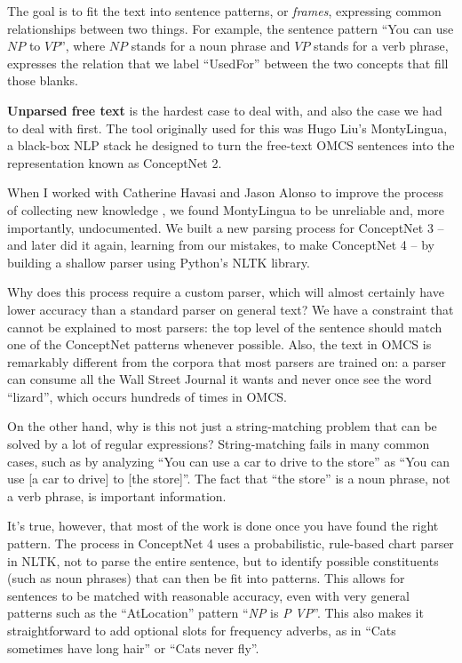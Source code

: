 \documentclass[11pt]{article}
\begin{document}
The goal is to fit the text into sentence patterns, or {\em frames}, expressing
common relationships between two things. For example, the sentence pattern
``You can use $NP$ to $VP$'', where $NP$ stands for a noun phrase and $VP$
stands for a verb phrase, expresses the relation that we label ``UsedFor''
between the two concepts that fill those blanks.

{\bf Unparsed free text} is the hardest case to deal with, and also the case we
had to deal with first. The tool originally used for this was Hugo Liu's
MontyLingua, a black-box NLP stack he designed to turn the free-text OMCS
sentences into the representation known as ConceptNet 2.

When I worked with Catherine Havasi and Jason Alonso to improve the process of
collecting new knowledge \cite{cnet3}, we found MontyLingua to be
unreliable and, more importantly, undocumented. We built a new parsing process
for ConceptNet 3 -- and later did it again, learning from our mistakes, to make
ConceptNet 4 -- by building a shallow parser using Python's NLTK library.

Why does this process require a custom parser, which will almost certainly have
lower accuracy than a standard parser on general text? We have a constraint
that cannot be explained to most parsers: the top level of the sentence should
match one of the ConceptNet patterns whenever possible. Also, the text in OMCS
is remarkably different from the corpora that most parsers are trained on: a
parser can consume all the Wall Street Journal it wants and never once see the
word ``lizard'', which occurs hundreds of times in OMCS.

On the other hand, why is this not just a string-matching problem that can be
solved by a lot of regular expressions?  String-matching fails in many common
cases, such as by analyzing ``You can use a car to drive to the store'' as
``You can use [a car to drive] to [the store]''. The fact that ``the store'' is
a noun phrase, not a verb phrase, is important information.

It's true, however, that most of the work is done once you have found the right
pattern. The process in ConceptNet 4 uses a probabilistic, rule-based chart
parser in NLTK, not to parse the entire sentence, but to identify possible
constituents (such as noun phrases) that can then be fit into patterns. This
allows for sentences to be matched with reasonable accuracy, even with very
general patterns such as the ``AtLocation'' pattern ``{\em NP} is {\em P} {\em VP}''. This
also makes it straightforward to add optional slots for frequency adverbs, as
in ``Cats sometimes have long hair'' or ``Cats never fly''.
\end{document}
